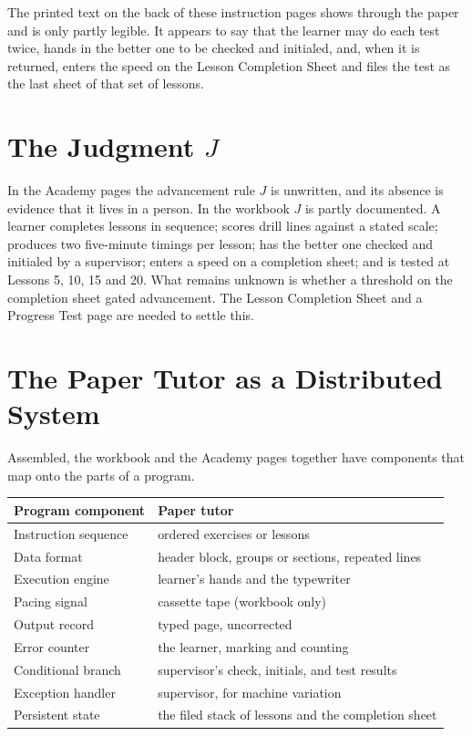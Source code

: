 The printed text on the back of these instruction pages shows through the paper and is only partly legible. It appears to say that the learner may do each test twice, hands in the better one to be checked and initialed, and, when it is returned, enters the speed on the Lesson Completion Sheet and files the test as the last sheet of that set of lessons. 

\section{The Judgment $J$}

In the Academy pages the advancement rule $J$ is unwritten, and its absence is evidence that it lives in a person. In the workbook $J$ is partly documented. A learner completes lessons in sequence; scores drill lines against a stated scale; produces two five-minute timings per lesson; has the better one checked and initialed by a supervisor; enters a speed on a completion sheet; and is tested at Lessons 5, 10, 15 and 20. What remains unknown is whether a threshold on the completion sheet gated advancement. The Lesson Completion Sheet and a Progress Test page are needed to settle this. 

\section{The Paper Tutor as a Distributed System}

Assembled, the workbook and the Academy pages together have components that map onto the parts of a program.

\begin{center}
\begin{tabular}{@{}p{4.2cm}p{7.4cm}@{}}
\toprule
Program component & Paper tutor \\
\midrule
Instruction sequence & ordered exercises or lessons \\
Data format & header block, groups or sections, repeated lines \\
Execution engine & learner's hands and the typewriter \\
Pacing signal & cassette tape (workbook only) \\
Output record & typed page, uncorrected \\
Error counter & the learner, marking and counting \\
Conditional branch & supervisor's check, initials, and test results \\
Exception handler & supervisor, for machine variation \\
Persistent state & the filed stack of lessons and the completion sheet \\
\bottomrule
\end{tabular}
\end{center}

